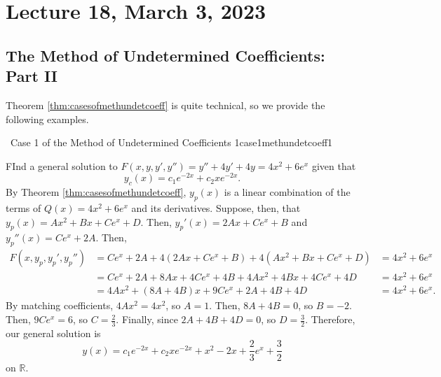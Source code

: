\section{Lecture 18, March 3, 2023}

    \subsection{The Method of Undetermined Coefficients: Part II}

    Theorem \ref{thm:casesofmethundetcoeff} is quite technical, so we provide the following examples.
    \begin{example}{\Difficulty\,\Difficulty\,\,Case 1 of the Method of Undetermined Coefficients 1}{case1methundetcoeff1}
        
        FInd a general solution to \(F(x,y,y',y'')=y''+4y'+4y=4x^2+6e^x\) given that 
        \begin{equation*}
            y_c(x)=c_1e^{-2x}+c_2xe^{-2x}.
        \end{equation*}
        By Theorem \ref{thm:casesofmethundetcoeff}, \(y_p(x)\) is a linear combination of the terms of \(Q(x)=4x^2+6e^x\) and its derivatives. Suppose, then, that \(y_p(x)=Ax^2+Bx+Ce^x+D\). Then, \(y_p'(x)=2Ax+Ce^x+B\) and \(y_p''(x)=Ce^x+2A\). Then,
        \begin{align*}
            F(x,y_p,y_p',y_p'')&=Ce^x+2A+4(2Ax+Ce^x+B)+4(Ax^2+Bx+Ce^x+D)&=4x^2+6e^x \\
            &=Ce^x+2A+8Ax+4Ce^x+4B+4Ax^2+4Bx+4Ce^x+4D&=4x^2+6e^x \\
            &=4Ax^2+(8A+4B)x+9Ce^x+2A+4B+4D&=4x^2+6e^x.
        \end{align*}
        By matching coefficients, \(4Ax^2=4x^2\), so \(A=1\). Then, \(8A+4B=0\), so \(B=-2\). Then, \(9Ce^x=6\), so \(C=\frac{2}{3}\). Finally, since \(2A+4B+4D=0\), so \(D=\frac{3}{2}\). Therefore, our general solution is
        \begin{equation*}
            y(x)=c_1e^{-2x}+c_2xe^{-2x}+x^2-2x+\frac{2}{3}e^x+\frac{3}{2}
        \end{equation*}
        on \(\mathbb{R}\).

    \end{example}
